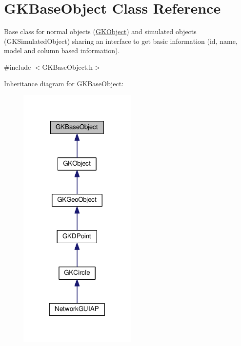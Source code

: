 \hypertarget{classGKBaseObject}{}\section{G\+K\+Base\+Object Class Reference}
\label{classGKBaseObject}


Base class for normal objects (\hyperlink{classGKObject}{G\+K\+Object}) and simulated objects (G\+K\+Simulated\+Object) sharing an interface to get basic information (id, name, model and column based information).  




{\ttfamily \#include $<$G\+K\+Base\+Object.\+h$>$}



Inheritance diagram for G\+K\+Base\+Object\+:
\nopagebreak
\begin{figure}[H]
\begin{center}
\leavevmode
\includegraphics[width=165pt]{classGKBaseObject__inherit__graph}
\end{center}
\end{figure}
